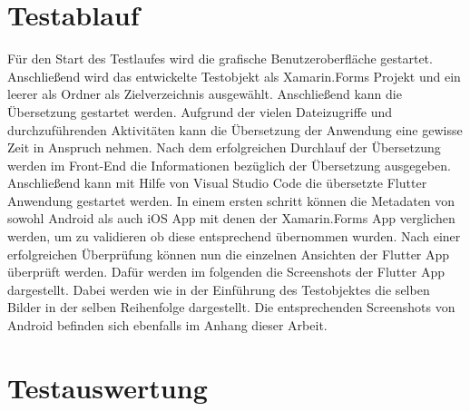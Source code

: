 \section{Testablauf}
Für den Start des Testlaufes wird die grafische Benutzeroberfläche gestartet. Anschließend wird das entwickelte Testobjekt als Xamarin.Forms Projekt und ein leerer als Ordner als Zielverzeichnis ausgewählt. Anschließend kann die Übersetzung gestartet werden.  Aufgrund der vielen Dateizugriffe und durchzuführenden Aktivitäten kann die Übersetzung der Anwendung eine gewisse Zeit in Anspruch nehmen. 
Nach dem erfolgreichen Durchlauf der Übersetzung werden im Front-End die Informationen bezüglich der Übersetzung ausgegeben.  
Anschließend kann mit Hilfe von Visual Studio Code die übersetzte Flutter Anwendung gestartet werden.  In einem ersten schritt können die Metadaten von sowohl Android als auch iOS App mit denen der Xamarin.Forms App verglichen werden, um zu validieren ob diese entsprechend übernommen wurden.
Nach einer erfolgreichen Überprüfung können nun die einzelnen Ansichten der Flutter App überprüft werden.  Dafür werden im folgenden die Screenshots der Flutter App dargestellt.  Dabei werden wie in der Einführung des Testobjektes die selben Bilder in der selben Reihenfolge dargestellt.  Die entsprechenden Screenshots von Android befinden sich ebenfalls im Anhang dieser Arbeit. 



\section{Testauswertung}

